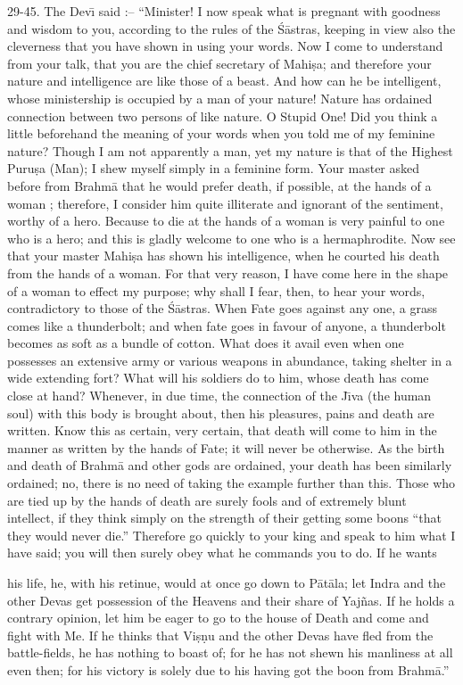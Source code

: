 29-45. The Dev\={\i} said :-- ``Minister! I now speak what is pregnant with goodness and wisdom to you, according to the rules of the \'S\=astras, keeping in view also the cleverness that you have shown in using your words. Now I come to understand from your talk, that you are the chief secretary of Mahi\d{s}a; and therefore your nature and intelligence are like those of a beast. And how can he be intelligent, whose ministership is occupied by a man of your nature! Nature has ordained connection between two persons of like nature. O Stupid One! Did you think a little beforehand the meaning of your words when you told me of my feminine nature? Though I am not apparently a man, yet my nature is that of the Highest Puru\d{s}a (Man); I shew myself simply in a feminine form. Your master asked before from Brahm\=a that he would prefer death, if possible, at the hands of a woman ; therefore, I consider him quite illiterate and ignorant of the sentiment, worthy of a hero. Because to die at the hands of a woman is very painful to one who is a hero; and this is gladly welcome to one who is a hermaphrodite. Now see that your master Mahi\d{s}a has shown his intelligence, when he courted his death from the hands of a woman. For that very reason, I have come here in the shape of a woman to effect my purpose; why shall I fear, then, to hear your words, contradictory to those of the \'S\=astras. When Fate goes against any one, a grass comes like a thunderbolt; and when fate goes in favour of anyone, a thunderbolt becomes as soft as a bundle of cotton. What does it avail even when one possesses an extensive army or various weapons in abundance, taking shelter in a wide extending fort? What will his soldiers do to him, whose death has come close at hand? Whenever, in due time, the connection of the J\={\i}va (the human soul) with this body is brought about, then his pleasures, pains and death are written. Know this as certain, very certain, that death will come to him in the manner as written by the hands of Fate; it will never be otherwise. As the birth and death of Brahm\=a and other gods are ordained, your death has been similarly ordained; no, there is no need of taking the example further than this. Those who are tied up by the hands of death are surely fools and of extremely blunt intellect, if they think simply on the strength of their getting some boons ``that they would never die.'' Therefore go quickly to your king and speak to him what I have said; you will then surely obey what he commands you to do. If he wants

his life, he, with his retinue, would at once go down to P\=at\=ala; let Indra and the other Devas get possession of the Heavens and their share of Yaj\~nas. If he holds a contrary opinion, let him be eager to go to the house of Death and come and fight with Me. If he thinks that Vi\d{s}\d{n}u and the other Devas have fled from the battle-fields, he has nothing to boast of; for he has not shewn his manliness at all even then; for his victory is solely due to his having got the boon from Brahm\=a.''

